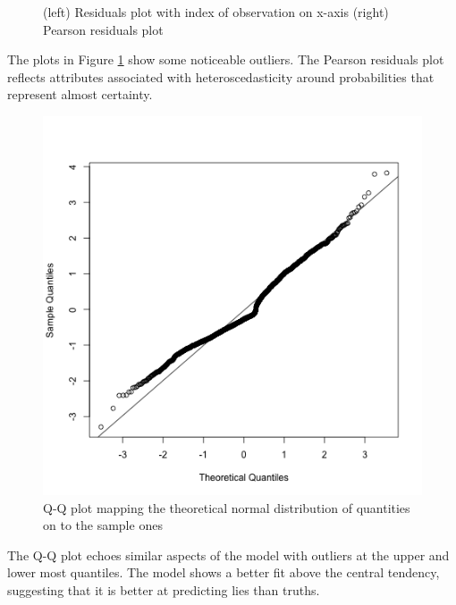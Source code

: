 \documentclass[man, floatsintext]{apa7}
\begin{document}
\begin{figure}[H]
	\caption{(left) Residuals plot with index of observation on x-axis (right) Pearson residuals plot}
	\label{fig:Residuals}
\end{figure}

The plots in Figure \ref{fig:Residuals} show some noticeable outliers. The Pearson residuals plot reflects attributes associated with heteroscedasticity around probabilities that represent almost certainty.

\begin{figure}[H]
	\centering
	\includegraphics[width=0.5\linewidth]{../plots/R/qqline}
	\caption{Q-Q plot mapping the theoretical normal distribution of quantities on to the sample ones}
	\label{fig:qqline}
\end{figure}

The Q-Q plot echoes similar aspects of the model with outliers at the upper and lower most quantiles. The model shows a better fit above the central tendency, suggesting that it is better at predicting lies than truths.

\end{document}
